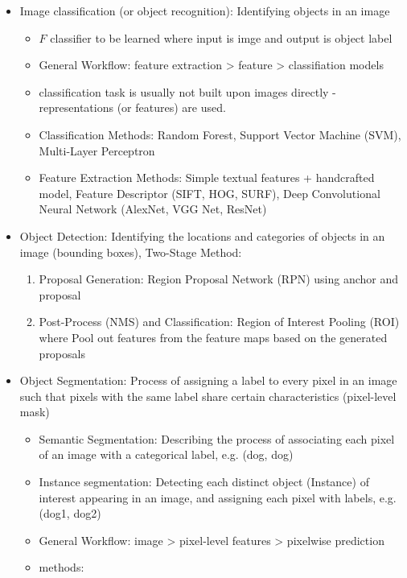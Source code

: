 \documentclass[10pt]{article}
\begin{document}
\begin{itemize}[label=\(\star\), leftmargin=1em, itemsep=-0.3em]
    \item Image classification (or object recognition): Identifying objects in an image
          \begin{itemize}[label=\(\star\), leftmargin=1em, itemsep=-0.3em]
              \item $F$ classifier to be learned where input is imge and output is object label
              \item General Workflow: feature extraction > feature > classifiation models
              \item classification task is usually not built upon images directly - representations (or features) are used.
              \item Classification Methods: Random Forest, Support Vector Machine (SVM), Multi-Layer Perceptron
              \item Feature Extraction Methods: Simple textual features + handcrafted model, Feature Descriptor (SIFT, HOG, SURF), Deep Convolutional Neural Network (AlexNet, VGG Net, ResNet)
          \end{itemize}
    \item Object Detection: Identifying the locations and categories of objects in an image (bounding boxes), Two-Stage Method:
          \begin{enumerate}[label=\(\star\), leftmargin=1em, itemsep=-0.3em]
              \item Proposal Generation: Region Proposal Network (RPN) using anchor and proposal
              \item Post-Process (NMS) and Classification: Region of Interest Pooling (ROI) where Pool out features from the feature maps based on the generated proposals
          \end{enumerate}

    \item Object Segmentation: Process of assigning a label to every pixel in an image such that pixels with the same label share certain characteristics (pixel-level mask)
          \begin{itemize}[label=\(\star\), leftmargin=1em, itemsep=-0.3em]
              \item  Semantic Segmentation: Describing the process of associating each pixel of an image with a categorical label, e.g. (dog, dog)
              \item  Instance segmentation: Detecting each distinct object (Instance) of interest appearing in an image, and assigning each pixel with labels, e.g. (dog1, dog2)
              \item General Workflow: image > pixel-level features > pixelwise prediction
              \item methods:


\end{itemize}
\end{itemize}
\end{document}
